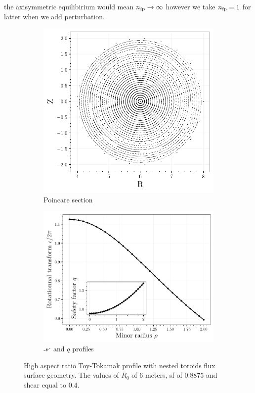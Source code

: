 the axisymmetric equilibirium would mean $n_\text{fp} \to \infty$ however we take $n_\text{fp} = 1$ for latter when we add perturbation.

\begin{figure}
    \centering
    \begin{subfigure}[t]{0.43\textwidth}
        \centering
        \label{fig:b}
        \includegraphics[width=\textwidth]{images/high-aspect-ratio/unperturbed.pdf}
        \caption{Poincare section}
    \end{subfigure}
    \hfill
    \begin{subfigure}[t]{0.54\textwidth}
        \centering
        \label{fig:b}
        \includegraphics[width=\textwidth]{images/high-aspect-ratio/iota_q.pdf}
        \caption{$\iotaslash$ and $q$ profiles}
    \end{subfigure}
    \caption{High aspect ratio Toy-Tokamak profile with nested toroids flux surface geometry. The values of $R_0$ of 6 meters, sf of 0.8875 and shear equal to 0.4.}
    \label{fig:a}
\end{figure}

